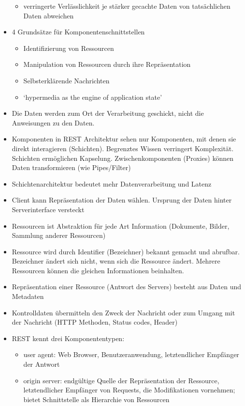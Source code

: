 \begin{itemize}
\begin{itemize}
    \item verringerte Verlässlichkeit je stärker gecachte Daten von tatsächlichen Daten abweichen
  \end{itemize}
  \item 4 Grundsätze für Komponentenschnittstellen
  \begin{itemize}
    \item Identifizierung von Ressourcen
    \item Manipulation von Ressourcen durch ihre Repräsentation
    \item Selbsterklärende Nachrichten
    \item `hypermedia as the engine of application state'
  \end{itemize}
  \item Die Daten werden zum Ort der Verarbeitung geschickt, nicht die Anweisungen zu den Daten.
  \item Komponenten in REST Architektur sehen nur Komponenten, mit denen sie direkt interagieren (Schichten). Begrenztes Wissen verringert Komplexität. Schichten ermöglichen Kapselung. Zwischenkomponenten (Proxies) können Daten transformieren (wie Pipes/Filter)
  \item Schichtenarchitektur bedeutet mehr Datenverarbeitung und Latenz
  \item Client kann Repräsentation der Daten wählen. Ursprung der Daten hinter Serverinterface versteckt
  \item Ressourcen ist Abstraktion für jede Art Information (Dokumente, Bilder, Sammlung anderer Ressourcen)
  \item Ressource wird durch Identifier (Bezeichner) bekannt gemacht und abrufbar. Bezeichner ändert sich nicht, wenn sich die Ressource ändert. Mehrere Ressourcen können die gleichen Informationen beinhalten.
  \item Repräsentation einer Ressource (Antwort des Servers) besteht aus Daten und Metadaten
  \item Kontrolldaten übermitteln den Zweck der Nachricht oder zum Umgang mit der Nachricht (HTTP Methoden, Status codes, Header)
  \item REST kennt drei Komponententypen:
  \begin{itemize}
    \item user agent: Web Browser, Benutzeranwendung, letztendlicher Empfänger der Antwort
    \item origin server: endgültige Quelle der Repräsentation der Ressource, letztendlicher Empfänger von Requests, die Modifikationen vornehmen; bietet Schnittstelle als Hierarchie von Ressourcen

\end{itemize}
\end{itemize}
